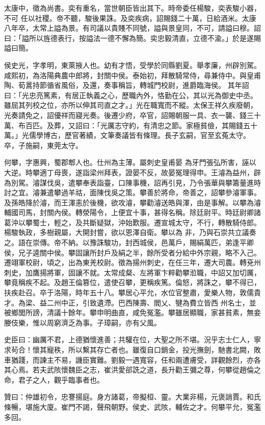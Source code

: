 \begin{pinyinscope}
 太康中，徵為尚書。奕有重名，當世朝臣皆出其下。時帝委任楊駿，奕表駿小器，不可
 任以社稷。帝不聽，駿後果誅。及奕疾病，詔賜錢二十萬，日給酒米。太康八年卒，太常上謚為景。有司議以貴賤不同號，謚與景皇同，不可，請謚曰穆。詔曰：「謚所以旌德表行，按謚法一德不懈為簡。奕忠毅清直，立德不渝。」於是遂賜謚曰簡。



 侯史光，字孝明，東萊掖人也。幼有才悟，受學於同縣劉夏。舉孝廉，州辟別駕。咸熙初，為洛陽典農中郎將，封關中侯。泰始初，拜散騎常侍，尋兼侍中。與皇甫陶、荀暠持節循省風俗，及還，奏事稱旨，轉城門校尉，進爵臨海侯。
 其年詔曰：「光忠亮篤素，有居正執義之心，歷職內外，恪勤在公，其以光為御史中丞。雖屈其列校之位，亦所以伸其司直之才。」光在職寬而不縱。太保王祥久疾廢朝，光奏請免之，詔優祥而寢光奏。後遷少府，卒官，詔賜朝服一具、衣一襲、錢三十萬、布百匹。及葬，又詔曰：「光厲志守約，有清忠之節。家極貧儉，其賜錢五十萬。」光儒學博古，歷官著績，文筆奏議皆有條理。長子玄嗣，官至玄菟太守。卒，子施嗣，東莞太守。



 何攀，字惠興，蜀郡郫人也。仕州為主薄。屬刺史皇甫晏
 為牙門張弘所害，誣以大逆。時攀適丁母喪，遂詣梁州拜表，證晏不反，故晏冤理得申。王濬為益州，辟為別駕。濬謀伐吳，遣攀奉表詣臺，口陳事機，詔再引見，乃令張華與攀籌量進時討之宜。濬兼遣攀過羊祜，面陳伐吳之策。攀善於將命，帝善之，詔攀參濬軍事。及孫皓降於濬，而王渾恚於後機，欲攻濬，攀勸濬送皓與渾，由是事解。以攀為濬輔國司馬，封關內侯。轉滎陽令，上便宜十事，甚得名稱。除廷尉平。時廷尉卿諸葛沖以攀蜀士，輕之，及共斷疑獄，沖始歎服。遷宣城太守，不行，轉散騎侍郎。楊駿執政，多樹親屬，大開封嘗，欲以恩澤自衛。攀以為
 非，乃與石崇共立議奏之。語在崇傳。帝不納。以豫誅駿功，封西城侯，邑萬戶，賜絹萬匹，弟逢平卿侯，兄子逵關中侯。攀固讓所封戶及絹之半，餘所受者分給中外宗親，略不入己。遷翊軍校尉，頃之，出為東羌校尉。徵為揚州刺史，在任三年，遷大司農。轉兗州刺史，加鷹揚將軍，固讓不就。太常成粲、左將軍卞粹勸攀涖職，中詔又加切厲，攀竟稱疾不起。及趙王倫篡位，遣使召攀，更稱疾篤。倫怒，將誅之，攀不得已，扶疾赴召。卒于洛陽，時年五十八。攀居心平允，水位官整肅，愛樂人物，敦儒貴才。為梁、益二州中正，引致遺滯。巴西陳壽、閻乂、犍為費立皆西
 州名士，並被鄉閭所謗，清議十餘年。攀申明曲直，咸免冤濫。攀雖居顯職，家甚貧素，無妾媵伎樂，惟以周窮濟乏為事。子璋嗣，亦有父風。



 史臣曰：幽厲不君，上德猶懷進善；共驩在位，大聖之所不堪。況乎志士仁人，寧求茍合！懷其寵秩，所以繫其存亡者也。雖復自口銷金，投光撫劍，馳書北闕，敗車猶踐，而諫主不易，譏臣實難。劉毅一遇寬容，任和兩遭膚受，詳觀餘烈，亦各其心焉。若夫武陔懷魏臣之志，崔洪愛郤詵之道，長升勸王彌之尊，何攀從趙倫之命，君子之人，觀乎臨事者也。



 贊曰：仲雄初令，忠謇揚庭。身方諸葛，帝擬桓、靈。大業非楊，元褒誚賈。和氏條暢，堪施大廈。崔門不謁，聲飛朝野。侯史、武陔，輔佐之才。何攀平允，冤濫多回。



\end{pinyinscope}